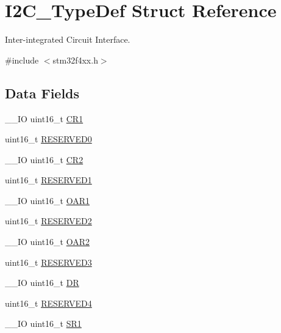 \hypertarget{struct_i2_c___type_def}{\section{I2\-C\-\_\-\-Type\-Def Struct Reference}
\label{struct_i2_c___type_def}
}


Inter-\/integrated Circuit Interface.  




{\ttfamily \#include $<$stm32f4xx.\-h$>$}

\subsection*{Data Fields}
\begin{DoxyCompactItemize}
\item 
\-\_\-\-\_\-\-I\-O uint16\-\_\-t \hyperlink{struct_i2_c___type_def_a61400ce239355b62aa25c95fcc18a5e1}{C\-R1}
\item 
uint16\-\_\-t \hyperlink{struct_i2_c___type_def_a149feba01f9c4a49570c6d88619f504f}{R\-E\-S\-E\-R\-V\-E\-D0}
\item 
\-\_\-\-\_\-\-I\-O uint16\-\_\-t \hyperlink{struct_i2_c___type_def_a2a3e81bd118d1bc52d24a0b0772e6a0c}{C\-R2}
\item 
uint16\-\_\-t \hyperlink{struct_i2_c___type_def_a8249a3955aace28d92109b391311eb30}{R\-E\-S\-E\-R\-V\-E\-D1}
\item 
\-\_\-\-\_\-\-I\-O uint16\-\_\-t \hyperlink{struct_i2_c___type_def_aaab934113da0a8bcacd1ffa148046569}{O\-A\-R1}
\item 
uint16\-\_\-t \hyperlink{struct_i2_c___type_def_a5573848497a716a9947fd87487709feb}{R\-E\-S\-E\-R\-V\-E\-D2}
\item 
\-\_\-\-\_\-\-I\-O uint16\-\_\-t \hyperlink{struct_i2_c___type_def_a692c0f6e38cde9ec1c3c50c36aa79817}{O\-A\-R2}
\item 
uint16\-\_\-t \hyperlink{struct_i2_c___type_def_a6c3b31022e6f59b800e9f5cc2a89d54c}{R\-E\-S\-E\-R\-V\-E\-D3}
\item 
\-\_\-\-\_\-\-I\-O uint16\-\_\-t \hyperlink{struct_i2_c___type_def_a0a1acc0425516ff7969709d118b96a3b}{D\-R}
\item 
uint16\-\_\-t \hyperlink{struct_i2_c___type_def_aa0223808025f5bf9c056185038c9d545}{R\-E\-S\-E\-R\-V\-E\-D4}
\item 
\-\_\-\-\_\-\-I\-O uint16\-\_\-t \hyperlink{struct_i2_c___type_def_a1e79a16729e8d1032d9fe552d50dce41}{S\-R1}
\item 

\end{DoxyCompactItemize}
